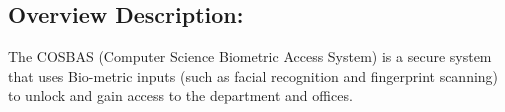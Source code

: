 \subsection{Overview Description:}
	The COSBAS (Computer Science Biometric Access System) is a secure system that uses Bio-metric inputs (such as facial recognition and fingerprint scanning) to unlock and gain access to the department and offices.